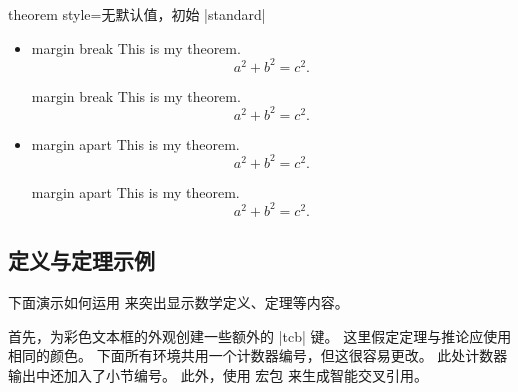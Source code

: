 \begin{docTcbKey}{theorem style}{=}{无默认值，初始 |standard|}
\begin{itemize}
\begin{dispExample}
\begin{theorem}[theorem style=margin,left=10mm,oversize]{margin}{}
This is my theorem. \begin{equation*} a^2 + b^2 = c^2. \end{equation*}
\end{theorem}
\end{dispExample}
%
\item{}
\begin{dispExample}
\begin{theorem}[theorem style=margin break,left=10mm]{margin break}{}
This is my theorem. \begin{equation*} a^2 + b^2 = c^2. \end{equation*}
\end{theorem}
\begin{theorem}[theorem style=margin break,left=10mm,oversize]{margin break}{}
This is my theorem. \begin{equation*} a^2 + b^2 = c^2. \end{equation*}
\end{theorem}
\end{dispExample}
%
\item{}
\begin{dispExample}
\begin{theorem}[theorem style=margin apart,left=10mm]{margin apart}{}
This is my theorem. \begin{equation*} a^2 + b^2 = c^2. \end{equation*}
\end{theorem}
\begin{theorem}[theorem style=margin apart,left=10mm,oversize]{margin apart}{}
This is my theorem. \begin{equation*} a^2 + b^2 = c^2. \end{equation*}
\end{theorem}
\end{dispExample}
%
\end{itemize}
\end{docTcbKey}


%
\clearpage
\subsection{定义与定理示例}
下面演示如何运用 
来突出显示数学定义、定理等内容。

首先，为彩色文本框的外观创建一些额外的 |tcb| 键。
这里假定定理与推论应使用相同的颜色。
下面所有环境共用一个计数器编号，但这很容易更改。
此处计数器输出中还加入了小节编号。
此外，使用  宏包 \cite{barros:zref-clever} 来生成智能交叉引用。

